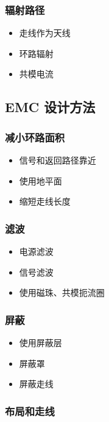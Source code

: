 \subsubsection{辐射路径}

\begin{itemize}
  \item 走线作为天线
  \item 环路辐射
  \item 共模电流
\end{itemize}

\subsection{EMC 设计方法}

\subsubsection{减小环路面积}

\begin{itemize}
  \item 信号和返回路径靠近
  \item 使用地平面
  \item 缩短走线长度
\end{itemize}

\subsubsection{滤波}

\begin{itemize}
  \item 电源滤波
  \item 信号滤波
  \item 使用磁珠、共模扼流圈
\end{itemize}

\subsubsection{屏蔽}

\begin{itemize}
  \item 使用屏蔽层
  \item 屏蔽罩
  \item 屏蔽走线
\end{itemize}

\subsubsection{布局和走线}

